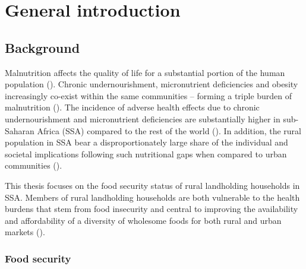 \chapter[General introduction]{General introduction}
\label{cha:Chapter1}
\vspace*{\fill}


\newpage

\section{Background}

Malnutrition affects the quality of life for a substantial portion of the human population (\citealp{GBD2016RiskFactorsCollaborators2017}). Chronic undernourishment, micronutrient deficiencies and obesity increasingly co-exist within the same communities – forming a triple burden of malnutrition (\citealp{May2018}). The incidence of adverse health effects due to chronic undernourishment and micronutrient deficiencies are substantially higher in sub-Saharan Africa (SSA) compared to the rest of the world (\citealp{Godecke2018, GBD2016RiskFactorsCollaborators2017}). In addition, the rural population in SSA bear a disproportionately large share of the individual and societal implications following such nutritional gaps when compared to urban communities (\citealp{Headey2018a, Green2016}).

This thesis focuses on the food security status of rural landholding households in SSA. Members of rural landholding households are both vulnerable to the health burdens that stem from food insecurity and central to improving the availability and affordability of a diversity of wholesome foods for both rural and urban markets (\citealp{Fanzo2018}).

\subsection{Food security}


